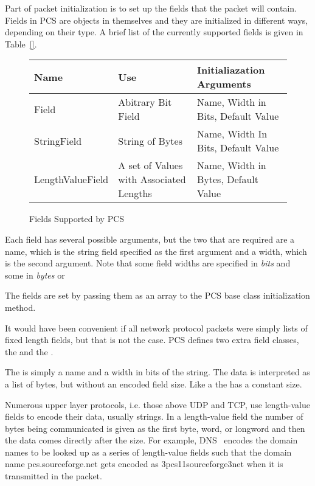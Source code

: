 \documentclass[11pt]{article}
\begin{document}
Part of packet initialization is to set up the fields that the packet
will contain.  Fields in PCS are objects in themselves and
they are initialized in different ways, depending on their type.  A
brief list of the currently supported fields is given in Table~\ref{}.

\begin{figure}
  \centering
  \begin{tabular}{|l|l|l|}
    \hline
    Name & Use & Initialiazation Arguments\\
    \hline
    Field & Abitrary Bit Field & Name, Width in Bits, Default Value\\
    \hline
    StringField & String of Bytes & Name, Width In Bits, Default Value\\
    \hline
    LengthValueField & A set of Values with Associated Lengths & Name,
    Width in Bytes, Default Value\\
    \hline
  \end{tabular}
  \caption{Fields Supported by PCS}
  \label{fig:fields_supported_by_pcs}
\end{figure}

Each field has several possible arguments, but the two that are
required are a name, which is the string field specified as the first
argument and a width, which is the second argument.  Note that some
field widths are specified in \emph{bits} and some in \emph{bytes} or

The fields are set by passing them as an array to the PCS base class
initialization method.

It would have been convenient if all network protocol packets were
simply lists of fixed length fields, but that is not the case.  PCS
defines two extra field classes, the  and the
.

The  is simply a name and a width in bits of the
string.  The data is interpreted as a list of bytes, but without an
encoded field size.  Like a  the  has
a constant size.

Numerous upper layer protocols, i.e. those above UDP and TCP, use
length-value fields to encode their data, usually strings.  In a
length-value field the number of bytes being communicated is given as
the first byte, word, or longword and then the data comes directly
after the size.  For example, DNS~\cite{rfc1035} encodes the domain
names to be looked up as a series of length-value fields such that the
domain name pcs.sourceforge.net gets encoded as 3pcs11sourceforge3net
when it is transmitted in the packet.
\end{document}
